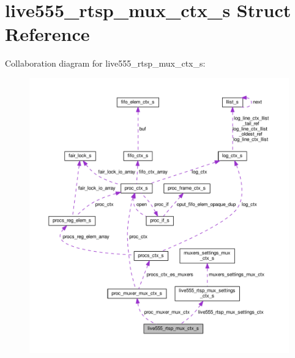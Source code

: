 \hypertarget{structlive555__rtsp__mux__ctx__s}{}\section{live555\+\_\+rtsp\+\_\+mux\+\_\+ctx\+\_\+s Struct Reference}
\label{structlive555__rtsp__mux__ctx__s}


Collaboration diagram for live555\+\_\+rtsp\+\_\+mux\+\_\+ctx\+\_\+s\+:\nopagebreak
\begin{figure}[H]
\begin{center}
\leavevmode
\includegraphics[width=350pt]{structlive555__rtsp__mux__ctx__s__coll__graph}
\end{center}
\end{figure}
